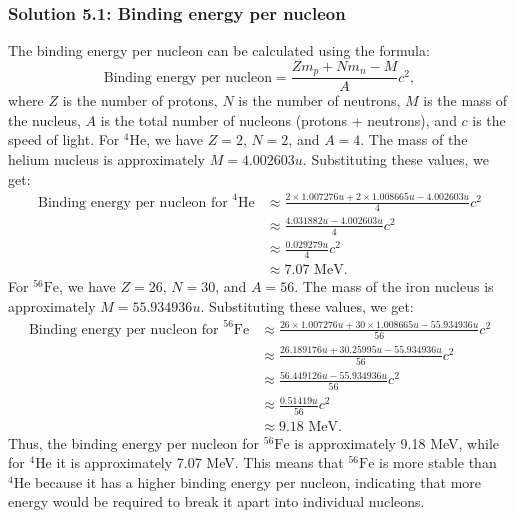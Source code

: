 \subsubsection{Solution 5.1: Binding energy per nucleon}
The binding energy per nucleon can be calculated using the formula:
\begin{equation*}
\text{Binding energy per nucleon} = \frac{Z m_p + N m_n - M}{A} c^2,
\end{equation*}
where $Z$ is the number of protons, $N$ is the number of neutrons, $M$ is the mass of the nucleus, $A$ is the total number of nucleons (protons + neutrons), and $c$ is the speed of light.
For $^{4}\text{He}$, we have $Z=2$, $N=2$, and $A=4$. The mass of the helium nucleus is approximately $M = 4.002603 u$. Substituting these values, we get:
\begin{align*}
\text{Binding energy per nucleon for } ^{4}\text{He} &\approx \frac{2 \times 1.007276 u + 2 \times 1.008665 u - 4.002603 u}{4} c^2 \\
&\approx \frac{4.031882 u - 4.002603 u}{4} c^2 \\
&\approx \frac{0.029279 u}{4} c^2 \\    
&\approx 7.07 \text{ MeV}.
\end{align*}
For $^{56}\text{Fe}$, we have $Z=26$, $N=30$, and $A=56$. The mass of the iron nucleus is approximately $M = 55.934936 u$. Substituting these values, we get:
\begin{align*}
\text{Binding energy per nucleon for } ^{56}\text{Fe} &\approx \frac{26 \times 1.007276 u + 30 \times 1.008665 u - 55.934936 u}{56} c^2 \\
&\approx \frac{26.189176 u + 30.25995 u - 55.934936 u}{56} c^2 \\
&\approx \frac{56.449126 u - 55.934936 u}{56} c^2 \\
&\approx \frac{0.51419 u}{56} c^2 \\
&\approx 9.18 \text{ MeV}.
\end{align*}
Thus, the binding energy per nucleon for $^{56}\text{Fe}$ is approximately 9.18 MeV, while for $^{4}\text{He}$ it is approximately 7.07 MeV. This means that $^{56}\text{Fe}$ is more stable than $^{4}\text{He}$ because it has a higher binding energy per nucleon, indicating that more energy would be required to break it apart into individual nucleons.


